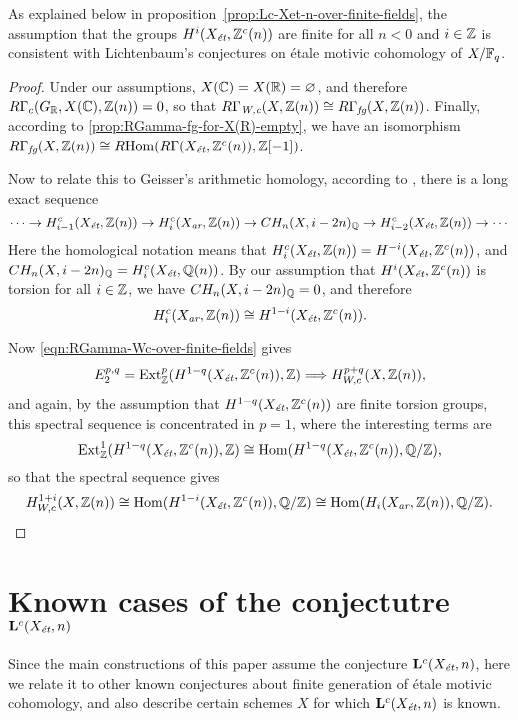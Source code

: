 \documentclass{article}
\numberwithin{equation}{section}
\begin{document}
As explained below in proposition~\ref{prop:Lc-Xet-n-over-finite-fields}, the
assumption that the groups $H^i (X_\et, \ZZ^c(n))$ are finite for all $n < 0$
and $i \in \ZZ$ is consistent with Lichtenbaum's conjectures on étale motivic
cohomology of $X/\FF_q$.

\begin{proof}
  Under our assumptions, $X (\CC) = X (\RR) = \emptyset$, and therefore
  $R\Gamma_c (G_\RR, X (\CC), \ZZ (n)) = 0$, so that
  $R\Gamma_\Wc (X,\ZZ(n)) \cong R\Gamma_\fg (X, \ZZ (n))$.
  Finally, according to \ref{prop:RGamma-fg-for-X(R)-empty}, we have
  an isomorphism
  $R\Gamma_\fg (X, \ZZ (n)) \cong \RHom (R\Gamma (X_\et, \ZZ^c (n)), \ZZ [-1])$.

  Now to relate this to Geisser's arithmetic homology, according to
  \cite[Theorem~3.1]{Geisser-2010-arithmetic-homology}, there is a long exact
  sequence
  \[ \cdots \to H_{i-1}^c (X_\et, \ZZ (n)) \to
    H_i^c (X_\ar, \ZZ (n)) \to CH_n (X, i-2n)_\QQ \to
    H_{i-2}^c (X_\et, \ZZ (n)) \to \cdots \]
  Here the homological notation means that
  $H_i^c (X_\et, \ZZ (n)) = H^{-i} (X_\et, \ZZ^c (n))$,
  and $CH_n (X, i-2n)_\QQ = H_i^c (X_\et, \QQ (n))$. By our assumption that
  $H^i (X_\et, \ZZ^c (n))$ is torsion for all $i \in \ZZ$, we have
  $CH_n (X, i-2n)_\QQ = 0$, and therefore
  $$H_i^c (X_\ar, \ZZ (n)) \cong H^{1-i} (X_\et, \ZZ^c (n)).$$

  Now \eqref{eqn:RGamma-Wc-over-finite-fields} gives
  \[ E_2^{p,q} = \Ext_\ZZ^p (H^{1-q} (X_\et, \ZZ^c (n)), \ZZ) \Longrightarrow
    H^{p+q}_{W,c} (X, \ZZ (n)), \]
  and again, by the assumption that $H^{1-q} (X_\et, \ZZ^c (n))$ are finite
  torsion groups, this spectral sequence is concentrated in $p = 1$,
  where the interesting terms are
  \[ \Ext_\ZZ^1 (H^{1-q} (X_\et, \ZZ^c (n)), \ZZ) \cong
    \Hom (H^{1-q} (X_\et, \ZZ^c (n)), \QQ/\ZZ), \]
  so that the spectral sequence gives
  \[ H^{1+i}_{W,c} (X, \ZZ (n)) \cong
    \Hom (H^{1-i} (X_\et, \ZZ^c (n)), \QQ/\ZZ) \cong
    \Hom (H_i (X_\ar, \ZZ (n)), \QQ/\ZZ). \qedhere \]
\end{proof}


\section{Known cases of the conjectutre $\mathbf{L}^c (X_\et,n)$}
\label{sec:known-cases-of-Lc-Xet-n}

Since the main constructions of this paper assume the conjecture
$\mathbf{L}^c (X_\et,n)$, here we relate it to other known conjectures about
finite generation of étale motivic cohomology, and also describe certain schemes
$X$ for which $\mathbf{L}^c (X_\et,n)$ is known.
\end{document}
